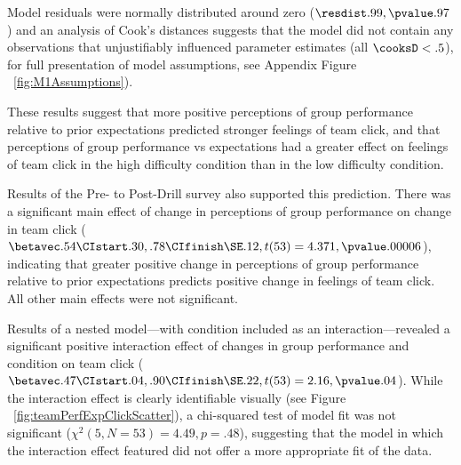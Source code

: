 Model residuals were normally distributed around zero ($\resdist .99, \pvalue .97 $) and an analysis of Cook's distances suggests that the model did not contain any observations that unjustifiably influenced parameter estimates (all $\cooksD < .5$), for full presentation of model assumptions, see Appendix Figure ~\ref{fig:M1Assumptions}).

These results suggest that more positive perceptions of group performance relative to prior expectations predicted stronger feelings of team click, and that perceptions of group performance vs expectations had a greater effect on feelings of team click in the high difficulty condition than in the low difficulty condition.





Results of the Pre- to Post-Drill survey also supported this prediction.  There was a significant main effect of change in perceptions of group performance on change in team click ($\betavec .54 \CIstart .30, .78 \CIfinish \SE .12, t(53) = 4.371, \pvalue .00006$), indicating that greater positive change in perceptions of group performance relative to prior expectations predicts positive change in feelings of team click.  All other main effects were not significant.

Results of a nested model---with condition included as an interaction---revealed a significant positive interaction effect of changes in group performance and condition on team click ($\betavec .47 \CIstart .04, .90 \CIfinish \SE .22, t(53) = 2.16, \pvalue .04 $).  While the interaction effect is clearly identifiable visually (see Figure ~\ref{fig:teamPerfExpClickScatter}),
a chi-squared test of model fit was not significant ($\chi^2 (5, N = 53) = 4.49, p = .48$), suggesting that the model in which the interaction effect featured did not offer a more appropriate fit of the data.

